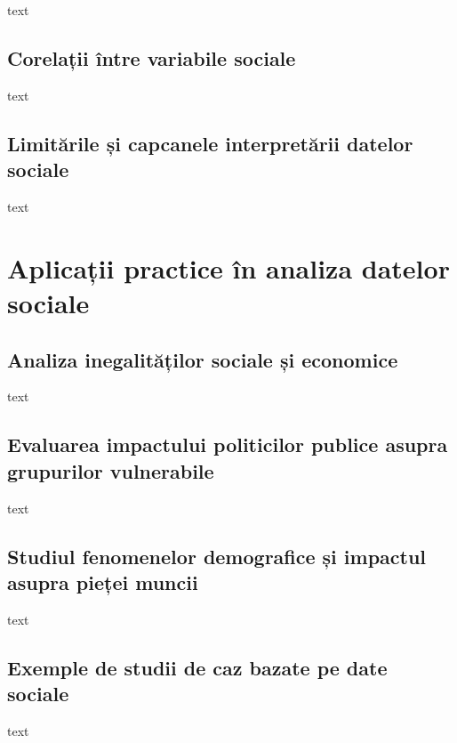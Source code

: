 \documentclass[
  11pt,
  b5paper,
  nottoc]{book}
\begin{document}
text

\subsection{Corelații între variabile
sociale}\label{corelaux21bii-uxeentre-variabile-sociale}

text

\subsection{Limitările și capcanele interpretării datelor
sociale}\label{limitux103rile-ux219i-capcanele-interpretux103rii-datelor-sociale}

text

\section{Aplicații practice în analiza datelor
sociale}\label{aplicaux21bii-practice-uxeen-analiza-datelor-sociale}

\subsection{Analiza inegalităților sociale și
economice}\label{analiza-inegalitux103ux21bilor-sociale-ux219i-economice}

text

\subsection{Evaluarea impactului politicilor publice asupra grupurilor
vulnerabile}\label{evaluarea-impactului-politicilor-publice-asupra-grupurilor-vulnerabile}

text

\subsection{Studiul fenomenelor demografice și impactul asupra pieței
muncii}\label{studiul-fenomenelor-demografice-ux219i-impactul-asupra-pieux21bei-muncii}

text

\subsection{Exemple de studii de caz bazate pe date
sociale}\label{exemple-de-studii-de-caz-bazate-pe-date-sociale}

text
\end{document}
